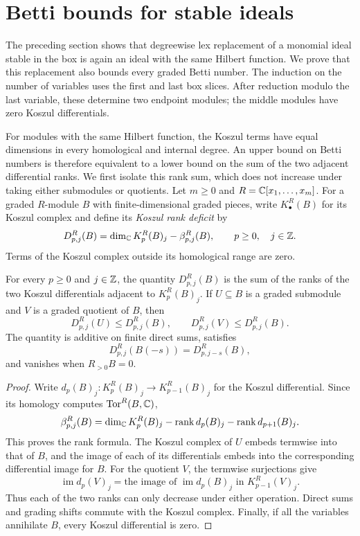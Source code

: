 \section{Betti bounds for stable ideals}
\label{sec:tor}

The preceding section shows that degreewise lex replacement of a
monomial ideal stable in the box is again an ideal with the same
Hilbert function.  We prove that this replacement also bounds every
graded Betti number.  The induction on the number of variables uses
the first and last box slices.  After reduction modulo the last variable,
these determine two endpoint modules; the middle modules have zero
Koszul differentials.

For modules with the same Hilbert function, the Koszul terms have equal
dimensions in every homological and internal degree.  An upper bound on
Betti numbers is therefore equivalent to a lower bound on the sum of the
two adjacent differential ranks.  We first isolate this rank sum, which
does not increase under taking either submodules or quotients.
Let $m\ge0$ and $R=\mathbb C[x_1,\ldots,x_m]$.  For a graded $R$-module $B$ with
finite-dimensional graded pieces, write $K^R_\bullet(B)$ for its
Koszul complex and define its \emph{Koszul rank deficit} by
\begin{equation}
\label{tor:deficit-definition}
 D^R_{p,j}(B)=\dim_\mathbb C K^R_p(B)_j-\beta^R_{p,j}(B),
 \qquad p\ge0,\quad j\in\mathbb Z.
\end{equation}
Terms of the Koszul complex outside its homological range are zero.

\begin{lemma}
\label{tor:deficit}
For every $p\ge0$ and $j\in\mathbb Z$, the quantity $D^R_{p,j}(B)$
is the sum of the ranks of the two Koszul differentials adjacent to
$K^R_p(B)_j$.  If $U\subseteq B$ is a graded submodule and $V$ is
a graded quotient of $B$, then
\[
 D^R_{p,j}(U)\le D^R_{p,j}(B),\qquad
 D^R_{p,j}(V)\le D^R_{p,j}(B).
\]
The quantity is additive on finite direct sums, satisfies
\[
 D^R_{p,j}(B(-s))=D^R_{p,j-s}(B),
\]
and vanishes when $R_{>0}B=0$.
\end{lemma}

\begin{proof}
Write $d_p(B)_j:K^R_p(B)_j\to K^R_{p-1}(B)_j$ for the Koszul
differential.  Since its homology computes $\operatorname{Tor}^R(B,\mathbb C)$,
\[
 \beta^R_{p,j}(B)
 =\dim_\mathbb C K^R_p(B)_j
       -\operatorname{rank}d_p(B)_j
       -\operatorname{rank}d_{p+1}(B)_j.
\]
This proves the rank formula.  The Koszul complex of $U$ embeds
termwise into that of $B$, and the image of each of its differentials
embeds into the corresponding differential image for $B$.
For the quotient $V$, the termwise surjections give
\[
 \operatorname{im}d_p(V)_j
   =\text{the image of }\operatorname{im}d_p(B)_j
       \text{ in }K^R_{p-1}(V)_j.
\]
Thus each of the two ranks can only decrease under either operation.
Direct sums and grading shifts commute with the Koszul complex.
Finally, if all the variables annihilate $B$, every Koszul differential
is zero.
\end{proof}

